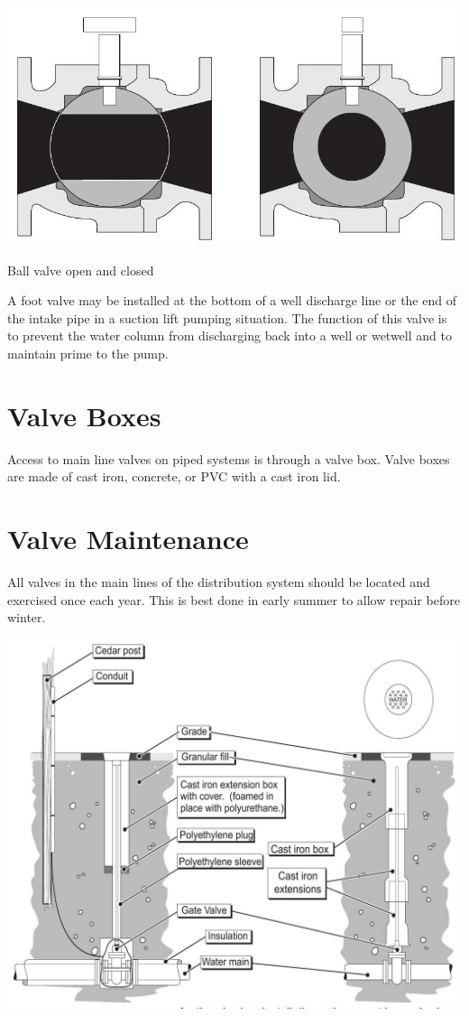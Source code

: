 \documentclass[10pt]{article}
\begin{document}
\includegraphics[max width=\textwidth]{BallValveInside}

Ball valve open and closed

A foot valve may be installed at the bottom of a well discharge line or the end of the intake pipe in a suction lift pumping situation. The function of this valve is to prevent the water column from discharging back into a well or wetwell and to maintain prime to the pump.

\section{Valve Boxes}
Access to main line valves on piped systems is through a valve box. Valve boxes are made of cast iron, concrete, or PVC with a cast iron lid.

\section{Valve Maintenance}
All valves in the main lines of the distribution system should be located and exercised once each year. This is best done in early summer to allow repair before winter.

\includegraphics[max width=\textwidth]{2022_11_03_fc0cbc2f3612fab6edd2g-19}
\end{document}
